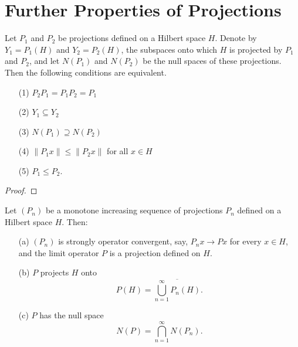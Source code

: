 \section{Further Properties of Projections}

\begin{theorem}
    Let \( {P}_{1}  \) and \( {P}_{2} \) be projections defined on a Hilbert space \( H  \). Denote by \( {Y}_{1} = {P}_{1}(H) \) and \( {Y}_{2} = {P}_{2}(H) \), the subspaces onto which \( H  \) is projected by \( {P}_{1} \) and \( {P}_{2} \), and let \( N({P}_{1}) \) and \( N({P}_{2}) \) be the null spaces of these projections. Then the following conditions are equivalent.
    \begin{enumerate}
        \item[(1)] \( {P}_{2}{P}_{1} = {P}_{1} {P}_{2} = {P}_{1} \)
        \item[(2)] \( {Y}_{1} \subseteq {Y}_{2} \)
        \item[(3)] \( N({P}_{1}) \supseteq N({P}_{2}) \)
        \item[(4)] \( \|{P}_{1}x\| \leq \|{P}_{2}x \|  \) for all \( x \in H  \)
        \item[(5)] \( {P}_{1} \leq {P}_{2} \).
    \end{enumerate}
\end{theorem}
\begin{proof}

\end{proof}

\begin{theorem}
    Let \( ({P}_{n}) \) be a monotone increasing sequence of projections \( {P}_{n} \) defined on a Hilbert space \( H  \). Then:
    \begin{enumerate}
        \item[(a)] \( ({P}_{n}) \) is strongly operator convergent, say, \( {P}_{n}x \to Px   \) for every \( x \in H  \), and the limit operator \( P  \) is a projection defined on \( H  \).
        \item[(b)] \( P \) projects \(H  \) onto 
            \[  P(H) = \overline{\bigcup_{ n=1  }^{ \infty  }  {P}_{n}(H) }. \]
        \item[(c)] \( P  \) has the null space 
            \[  N(P) = \bigcap_{ n=1  }^{ \infty  }  N({P}_{n}). \]
    \end{enumerate}
\end{theorem}
